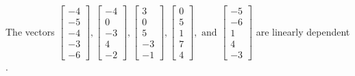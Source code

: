 \begin{exercise}
\begin{exerciseStatement}
  \end{exerciseStatement}
  \begin{exerciseAnswer}
   The vectors \(\left[\begin{array}{r}
-4 \\
-5 \\
-4 \\
-3 \\
-6
\end{array}\right] , \left[\begin{array}{r}
-4 \\
0 \\
-3 \\
4 \\
-2
\end{array}\right] , \left[\begin{array}{r}
3 \\
0 \\
5 \\
-3 \\
-1
\end{array}\right] , \left[\begin{array}{r}
0 \\
5 \\
1 \\
7 \\
4
\end{array}\right] , \text{ and } \left[\begin{array}{r}
-5 \\
-6 \\
1 \\
4 \\
-3
\end{array}\right]\) are 
  	 linearly dependent  .
  


  \end{exerciseAnswer}
\end{exercise}